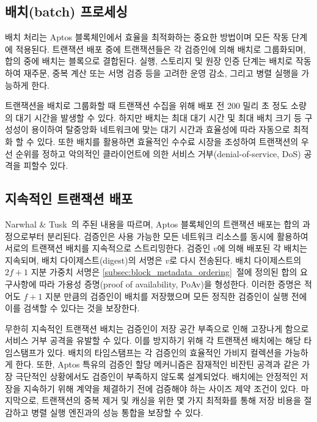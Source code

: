 \documentclass{article}
\begin{document}
\subsection{배치(batch) 프로세싱}
\label{sub:batch_processing}

배치 처리는 Aptos 블록체인에서 효율을 최적화하는 중요한 방법이며 모든 작동 단계에 적용된다. 트랜잭션 배포 중에 트랜잭션들은 각 검증인에 의해 배치로 그룹화되며, 합의 중에 배치는 블록으로 결합된다. 실행, 스토리지 및 원장 인증 단계는 배치로 작동하여 재주문, 중복 계산 또는 서명 검증 등을 고려한 운영 감소, 그리고 병렬 실행을 가능하게 한다.

트랜잭션을 배치로 그룹화할 때 트랜잭션 수집을 위해 배포 전 200 밀리 초 정도 소량의 대기 시간을 발생할 수 있다. 하지만 배치는 최대 대기 시간 및 최대 배치 크기 등 구성성이 용이하여 탈중앙화 네트워크에 맞는 대기 시간과 효율성에 따라 자동으로 최적화 할 수 있다. 또한 배치를 활용하면 효율적인 수수료 시장을 조성하여 트랜잭션의 우선 순위를 정하고 악의적인 클라이언트에 의한 서비스 거부(denial-of-service, DoS) 공격을 피할수 있다.

\subsection{지속적인 트랜잭션 배포}
\label{continuous_txn_dissemination}

Narwhal \& Tusk~\cite{narwhal_tusk}의 주된 내용을 따르며, Aptos 블록체인의 트랜잭션 배포는 합의 과정으로부터 분리된다. 검증인은 사용 가능한 모든 네트워크 리소스를 동시에 활용하여 서로의 트랜잭션 배치를 지속적으로 스트리밍한다. 검증인 $v$에 의해 배포된 각 배치는 지속되며, 배치 다이제스트(digest)의 서명은 $v$로 다시 전송된다. 배치 다이제스트의 $2f+1$ 지분 가중치 서명은 \ref{subsec:block_metadata_ordering}~절에 정의된 합의 요구사항에 따라 가용성 증명(proof of availability, PoAv)을 형성한다. 이러한 증명은 적어도 $f+1$ 지분 만큼의 검증인이 배치를 저장했으며 모든 정직한 검증인이 실행 전에 이를 검색할 수 있다는 것을 보장한다.

무한히 지속적인 트랜잭션 배치는 검증인이 저장 공간 부족으로 인해 고장나게 함으로 서비스 거부 공격을 유발할 수 있다. 이를 방지하기 위해 각 트랜잭션 배치에는 해당 타임스탬프가 있다. 배치의 타임스탬프는 각 검증인의 효율적인 가비지 컬렉션을 가능하게 한다. 또한, Aptos 특유의 검증인 할당 메커니즘은 잠재적인 비잔틴 공격과 같은 가장 극단적인 상황에서도 검증인이 부족하지 않도록 설계되었다. 배치에는 안정적인 저장을 지속하기 위해 계약을 체결하기 전에 검증해야 하는 사이즈 제약 조건이 있다. 마지막으로, 트랜잭션의 중복 제거 및 캐싱을 위한 몇 가지 최적화를 통해 저장 비용을 절감하고 병렬 실행 엔진과의 성능 통합을 보장할 수 있다.
\end{document}
